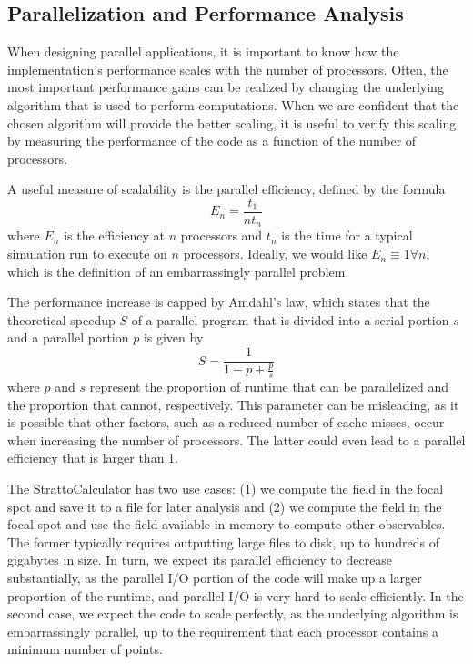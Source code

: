 \documentclass[11pt,SymmetricalJury]{inrsthesis/inrsthesis}
\begin{document}
\subsection{Parallelization and Performance Analysis}

When designing parallel applications, it is important to know how the implementation's
performance scales with the number of processors. Often, the most important
performance gains can be realized by changing the underlying algorithm that
is used to perform computations. When we are confident that the chosen algorithm
will provide the better scaling, it is useful to verify this scaling by measuring
the performance of the code as a function of the number of processors.

A useful measure of scalability is the parallel efficiency, defined by the
formula
  \begin{equation}
    E_n = \frac{t_1}{nt_n}
  \end{equation}
where $E_n$ is the efficiency at $n$ processors and $t_n$ is the time for a typical
simulation run to execute on $n$ processors. Ideally, we would like
$E_n\equiv1\forall n$, which is the definition of an embarrassingly parallel problem.

The performance increase is capped by Amdahl's law, which states that the
theoretical speedup $S$ of a parallel program that is divided into a serial
portion $s$ and a parallel portion $p$ is given by
  \begin{equation}
    S = \frac{1}{1-p+\frac{p}{s}}
  \end{equation}
where $p$ and $s$ represent the proportion of runtime that can be parallelized
and the proportion that cannot, respectively. This parameter can be misleading,
as it is possible that other factors, such as a reduced number of cache misses,
occur when increasing the number of processors. The latter could even lead to a
parallel efficiency that is larger than 1.

The StrattoCalculator has two use cases: (1) we compute the field in the focal
spot and save it to a file for later analysis and (2) we compute the field in
the focal spot and use the field available in memory to compute other
observables. The former typically requires outputting large files to disk, up to
hundreds of gigabytes in size. In turn, we expect its parallel efficiency to
decrease substantially, as the parallel I/O portion of the code will make up a
larger proportion of the runtime, and parallel I/O is very hard to scale
efficiently.  In the second case, we expect the code to scale
perfectly, as the underlying algorithm is embarrassingly parallel, up to the
requirement that each processor contains a minimum number of points.
\end{document}
